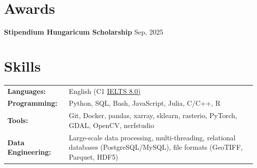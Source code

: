 \documentclass[a4paper,12pt]{article}
\begin{document}
\vspace{-1.5em}





  \section{Awards}

  \textbf{Stipendium Hungaricum Scholarship} \hfill Sep, 2025 


\noindent
\section{Skills}

\begin{tabularx}{\linewidth}{@{}l X@{}}

\textbf{Languages:} & English (C1 \href{https://drive.google.com/file/d/1IxH-0NrfMyf-ZqEpQFMrmtcXiDdzc00k/view?usp=sharing}{IELTS 8.0)}\\
\textbf{Programming:} & Python, SQL, Bash, JavaScript, Julia, C/C++, R \\
\textbf{Tools:} & Git, Docker, pandas, xarray, sklearn, rasterio, PyTorch, GDAL, OpenCV, nerfstudio \\
\textbf{Data Engineering:} & Large-scale data processing, multi-threading, relational databases (PostgreSQL/MySQL), file formats (GeoTIFF, Parquet, HDF5) \\

\end{tabularx}
\end{document}
